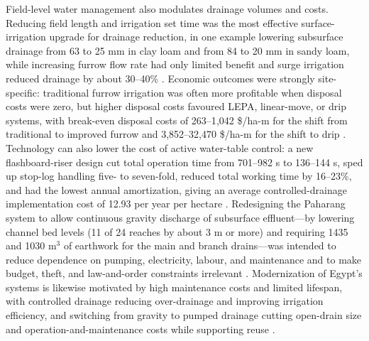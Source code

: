 \documentclass[11pt]{article}
\begin{document}
Field-level water management also modulates drainage volumes and costs. Reducing field length and irrigation set time was the most effective surface-irrigation upgrade for drainage reduction, in one example lowering subsurface drainage from 63 to 25 mm in clay loam and from 84 to 20 mm in sandy loam, while increasing furrow flow rate had only limited benefit and surge irrigation reduced drainage by about 30--40\% \parencite{HANSON1994}. Economic outcomes were strongly site-specific: traditional furrow irrigation was often more profitable when disposal costs were zero, but higher disposal costs favoured LEPA, linear-move, or drip systems, with break-even disposal costs of 263--1{,}042 \$/ha-m for the shift from traditional to improved furrow and 3{,}852--32{,}470 \$/ha-m for the shift to drip \parencite{HANSON1994}. Technology can also lower the cost of active water-table control: a new flashboard-riser design cut total operation time from 701--982 s to 136--144 s, sped up stop-log handling five- to seven-fold, reduced total working time by 16--23\%, and had the lowest annual amortization, giving an average controlled-drainage implementation cost of 12.93 per year per hectare \parencite{Napierala2024}. Redesigning the Paharang system to allow continuous gravity discharge of subsurface effluent---by lowering channel bed levels (11 of 24 reaches by about 3 m or more) and requiring 1435 and 1030 m$^{3}$ of earthwork for the main and branch drains---was intended to reduce dependence on pumping, electricity, labour, and maintenance and to make budget, theft, and law-and-order constraints irrelevant \parencite{Imran2021}. Modernization of Egypt's systems is likewise motivated by high maintenance costs and limited lifespan, with controlled drainage reducing over-drainage and improving irrigation efficiency, and switching from gravity to pumped drainage cutting open-drain size and operation-and-maintenance costs while supporting reuse \parencite{Ritzema2023}.
\end{document}
